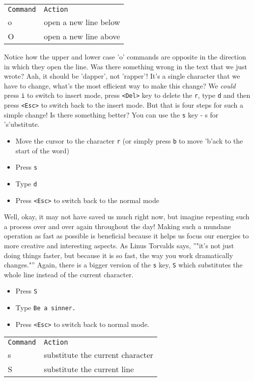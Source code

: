 \begin{tabular}{l p{4.5cm}}
\hline 
\texttt{Command} & \texttt{Action} \\  
o & open a new line below \\ 
O & open a new line above \\
\hline
\end{tabular} 
Notice how the upper and lower case 'o' commands are opposite in the direction
in which they open the line. Was there something wrong in the text that we just
wrote? Aah,
it should be 'dapper', not 'rapper'! It's a single character that we have to
change, what's the most efficient way to make this change? We \textit{could} press
\texttt{i} to switch to insert mode, press \texttt{<Del>} key to delete
the \texttt{r}, type \texttt{d} and then press \texttt{<Esc>} to switch
back to the insert mode. But that is four steps for such a simple change! Is
there something better? You can use the \texttt{s} key - s for 's'ubstitute. 
\begin{itemize}
\item Move the cursor to the character \texttt{r} (or simply press \texttt{b} to move
'b'ack to the start of the word) 
\item Press \texttt{s} 
\item Type \texttt{d} 
\item Press \texttt{<Esc>} to switch back to the normal mode 
\end{itemize}
Well, okay, it may not have saved us much right now, but imagine repeating such a process over and
over again throughout the day! Making such a mundane operation as fast as
possible is beneficial because it helps us focus our energies to more creative
and interesting aspects. As Linus Torvalds says, ''"it's not just doing things
faster, but because it is so fast, the way you work dramatically changes."''
Again, there is a bigger version of the \texttt{s} key, \texttt{S} which
substitutes the whole line instead of the current character. 
\begin{itemize}
\item Press \texttt{S}
\item Type \texttt{Be a sinner.} 
\item Press \texttt{<Esc>} to switch back to normal mode. 
\end{itemize}
\begin{tabular}{l l}
\hline 
\texttt{Command} & \texttt{Action} \\ 
s & substitute the current character \\ 
S & substitute the current line \\
\hline
\end{tabular} 
